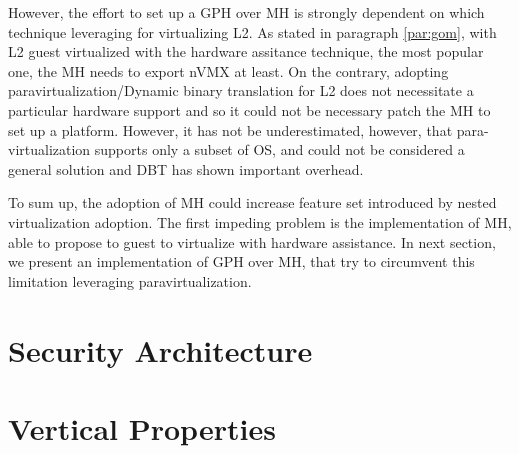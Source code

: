 \documentclass{sig-alternate}
\begin{document}
However, the effort to set up a GPH over MH is strongly dependent on which technique leveraging for virtualizing L2. As stated in paragraph \ref{par:gom}, with L2 guest virtualized with the hardware assitance technique, the most popular one, the MH needs to export nVMX at least. 
On the contrary, adopting paravirtualization/Dynamic binary translation for L2 does not necessitate a particular hardware support and so it could not be necessary patch the MH to set up a platform. 
However, it has not be underestimated, however, that para-virtualization supports only a subset of OS, and could not be considered a general solution and DBT has shown important overhead.

To sum up,  the adoption of MH could  increase feature set introduced by nested virtualization adoption. The first impeding problem is the implementation of MH, able to propose to guest to virtualize with hardware assistance. In next section, we present an implementation of GPH over MH, that try to circumvent this limitation leveraging paravirtualization.

\section{Security Architecture}
\label{ref:arch}

\section{Vertical Properties}
\end{document}
